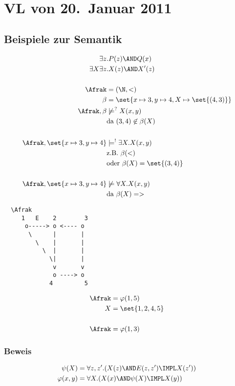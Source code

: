 \section{VL von 20.~Januar 2011}

\subsection{Beispiele zur Semantik}

\begin{align*}
  \exists z&.P(z) \AND Q(x) \\
  \exists X\exists z&.X(z) \AND X'(z) \\[\baselineskip]
  \Afrak &= (\N, <) \\
  \beta &= \set{x\mapsto 3,y\mapsto 4, X\mapsto\set{(4,3)}} \\
  \Afrak, \beta & \not\models^? X(x,y) \\
    &\text{da}\ (3,4) \not\in \beta(X) \\[\baselineskip]
  \Afrak, \set{x\mapsto 3,y\mapsto 4} &\models^! \exists X.X(x,y)\\
    &\text{z.B.}\ \beta(<) \\
    &\text{oder}\ \beta(X) = \set{(3,4)} \\[\baselineskip]
  \Afrak, \set{x\mapsto 3,y\mapsto 4} &\not\models \forall X.X(x,y) \\
    &\text{da}\ \beta(X) = >
\end{align*}

\begin{verbatim}
  \Afrak
     1   E    2        3
      o-----> o <---- o
       \      |       |
         \    |       |
           \  |       |
             \|       |
              v       v
              o ----> o
             4         5
\end{verbatim}

\begin{align*}
  \Afrak &= \varphi(1,5)\\
  X &= \set{1,2,4,5} \\[\baselineskip]
  \Afrak &= \varphi(1,3)
\end{align*}

\subsubsection{Beweis}

\begin{align*}
  \psi(X) &= \forall z,z'.(X(z) \AND E(z,z') \IMPL X(z'))\\
  \varphi(x,y) &= \forall X.(X(x) \AND \psi(X) \IMPL X(y))
\end{align*}

